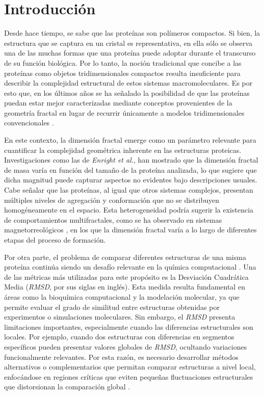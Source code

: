 \chapter{Introducción}

Desde hace tiempo, se sabe que las prote\'{i}nas son pol\'{i}meros compactos. Si bien, la estructura que se captura en un cristal es representativa, en ella s\'{o}lo se observa una de las muchas formas que una prote\'{i}na puede adoptar durante el transcurso de su funci\'{o}n biol\'{o}gica. Por lo tanto, la noci\'{o}n tradicional que concibe a las prote\'{i}nas como objetos tridimensionales compactos resulta insuficiente para describir la complejidad estructural de estos sistemas macromoleculares. Es por esto que, en los últimos años se ha señalado la posibilidad de que las prote\'{i}nas puedan estar mejor caracterizadas mediante conceptos provenientes de la geometría fractal en lugar de recurrir únicamente a modelos tridimensionales convencionales \cite{Dewey1997}.



En este contexto, la dimensión fractal emerge como un parámetro relevante para cuantificar la complejidad geométrica inherente en las estructuras proteicas. Investigaciones como las de \textit{Enright et al.}, han mostrado que la dimensión fractal de masa varía en función del tamaño de la proteína analizada, lo que sugiere que dicha magnitud puede capturar aspectos no evidentes bajo descripciones usuales. Cabe señalar que las proteínas, al igual que otros sistemas complejos, presentan múltiples niveles de agregación y conformación que no se distribuyen homogéneamente en el espacio. Esta heterogeneidad podría sugerir la existencia de comportamientos multifractales, como se ha observado en sistemas magnetorreológicos \cite{Carrillo2003}, en los que la dimensión fractal varía a lo largo de diferentes etapas del proceso de formación.\\

\clearpage

Por otra parte, el problema de comparar diferentes estructuras de una misma proteína continúa siendo un desafío relevante en la química computacional \cite{Kufareva2012}. Una de las métricas más utilizadas para este propósito es la Desviación Cuadrática Media (\textit{RMSD}, por sus siglas en inglés). Esta medida resulta fundamental en áreas como la bioquímica computacional y la modelación molecular, ya que permite evaluar el grado de similitud entre estructuras obtenidas por experimentos o simulaciones moleculares. Sin embargo, el \textit{RMSD} presenta limitaciones importantes, especialmente cuando las diferencias estructurales son locales. Por ejemplo, cuando dos estructuras con diferencias en segmentos específicos pueden presentar valores globales de \textit{RMSD}, ocultando variaciones funcionalmente relevantes. Por esta razón, es necesario desarrollar métodos alternativos o complementarios que permitan comparar estructuras a nivel local, enfocándose en regiones críticas que eviten pequeñas fluctuaciones estructurales que distorsionan la comparación global \cite{Kufareva2012}.\\

